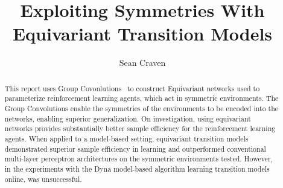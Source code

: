 
\title{Exploiting Symmetries With Equivariant Transition Models}
\author{Sean Craven}

\maketitle
\makedeclaration

\begin{abstract} %
	This report uses Group Covonlutions~\cite{cohen2016group} to construct Equivariant networks used to parameterize reinforcement learning agents, which act in symmetric environments. The Group Convolutions enable the symmetries of the environments to be encoded into the networks, enabling superior generalization. On investigation, using equivariant networks provides substantially better sample efficiency for the reinforcement learning agents. When applied to a model-based setting, equivariant transition models demonstrated superior sample efficiency in learning and outperformed conventional multi-layer perceptron architectures on the symmetric environments tested. However, in the experiments with the Dyna model-based algorithm learning transition models online, was unsuccessful.
\end{abstract}


\setcounter{tocdepth}{2}

\tableofcontents
\listoffigures
\listoftables


